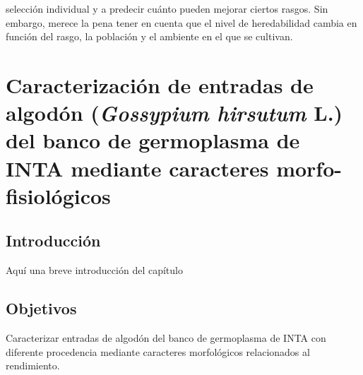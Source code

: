 \documentclass[12pt,oneside]{reedthesis}
\begin{document}
selección individual y a predecir cuánto pueden mejorar ciertos rasgos. Sin embargo, merece la pena tener en cuenta que el nivel de heredabilidad cambia en función del rasgo, la población y el ambiente en el que se cultivan.



















































\chapter{\texorpdfstring{Caracterización de entradas de algodón (\emph{Gossypium hirsutum} L.) del banco de germoplasma de INTA mediante caracteres morfo-fisiológicos}{Caracterización de entradas de algodón (Gossypium hirsutum L.) del banco de germoplasma de INTA mediante caracteres morfo-fisiológicos}}\label{rmd-basics}

\section{Introducción}\label{introducciuxf3n-1}

Aquí una breve introducción del capítulo\\

\section{Objetivos}\label{objetivos}

Caracterizar entradas de algodón del banco de germoplasma de INTA con diferente procedencia mediante caracteres morfológicos relacionados al rendimiento.
\end{document}
